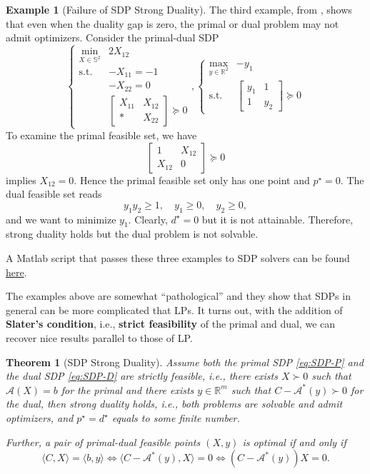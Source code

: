 \documentclass[
]{book}
\newtheorem{theorem}{Theorem}[chapter]
\theoremstyle{definition}
\theoremstyle{definition}
\newtheorem{example}{Example}[chapter]
\theoremstyle{definition}
\theoremstyle{definition}
\theoremstyle{remark}
\begin{document}
\begin{example}[Failure of SDP Strong Duality]
The third example, from \citep{todd01an-semidefinite}, shows that even when the duality gap is zero, the primal or dual problem may not admit optimizers. Consider the primal-dual SDP
\[
\begin{cases}
\min_{X \in \mathbb{S}^{2}} & 2 X_{12} \\
\mathrm{s.t.}& - X_{11} = -1 \\
& - X_{22} = 0 \\
& \begin{bmatrix} X_{11} & X_{12} \\ * & X_{22} \end{bmatrix} \succeq 0 
\end{cases},
\begin{cases}
\max_{y \in \mathbb{R}^{2}} & - y_1 \\
\mathrm{s.t.}& \begin{bmatrix} y_1 & 1 \\ 1 & y_2 \end{bmatrix} \succeq 0
\end{cases}
\]
To examine the primal feasible set, we have
\[
\begin{bmatrix} 1 & X_{12} \\ X_{12} & 0 \end{bmatrix} \succeq 0
\]
implies \(X_{12} = 0\). Hence the primal feasible set only has one point and \(p^\star = 0\). The dual feasible set reads
\[
y_1 y_2 \geq 1,\quad  y_1 \geq 0, \quad y_2 \geq 0,
\]
and we want to minimize \(y_1\). Clearly, \(d^\star = 0\) but it is not attainable. Therefore, strong duality holds but the dual problem is not solvable.

A Matlab script that passes these three examples to SDP solvers can be found \href{https://github.com/ComputationalRobotics/Semidefinite-Examples/blob/main/failure_strong_duality.m}{here}.
\end{example}

The examples above are somewhat ``pathological'' and they show that SDPs in general can be more complicated that LPs. It turns out, with the addition of \textbf{Slater's condition}, i.e., \textbf{strict feasibility} of the primal and dual, we can recover nice results parallel to those of LP.

\begin{theorem}[SDP Strong Duality]
\protect\hypertarget{thm:SDPStrongDuality}{}\label{thm:SDPStrongDuality}Assume both the primal SDP \eqref{eq:SDP-P} and the dual SDP \eqref{eq:SDP-D} are \emph{strictly feasible}, i.e., there exists \(X \succ 0\) such that \(\mathcal{A}(X)=b\) for the primal and there exists \(y \in \mathbb{R}^{m}\) such that \(C - \mathcal{A}^* (y) \succ 0\) for the dual, then strong duality holds, i.e., both problems are solvable and admit optimizers, and \(p^\star = d^\star\) equals to some finite number.

Further, a pair of primal-dual feasible points \((X,y)\) is optimal if and only if
\[
\langle C, X \rangle = \langle b, y \rangle \Leftrightarrow \langle C - \mathcal{A}^* (y), X \rangle = 0 \Leftrightarrow (C - \mathcal{A}^* (y)) X = 0.
\]
\end{theorem}
\end{document}
